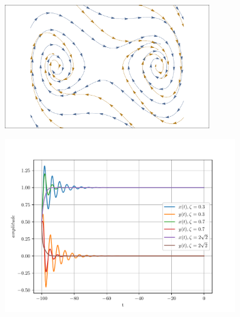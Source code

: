 \begin{solution}
\begin{figure}[h!]
        \caption{}
        \label{fig:ex2_dampedDuffing07Vec}
    \end{figure}
    \begin{figure}[h!]
        \centering
        \includegraphics[width=0.8\textwidth]{figures/ex2_dampedDuffing0307Vec.pdf}
        \caption{}
        \label{fig:ex2_dampedDuffing0307Vec}
    \end{figure}
    \begin{figure}[h!]
        \centering
        \includegraphics[width=0.9\textwidth]{figures/ex2_dampedDuffing.pdf}
        \caption{}
        \label{fig:ex2_dampedDuffing}
    \end{figure}
\end{solution}
